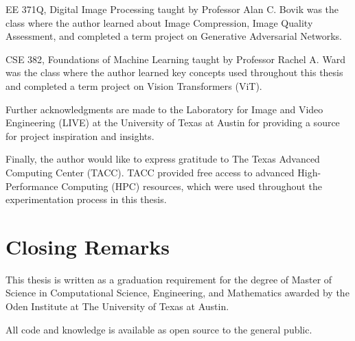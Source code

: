 EE 371Q, Digital Image Processing taught by Professor Alan C. Bovik was the class
where the author learned about 
Image Compression, Image Quality Assessment, and completed a term
project on Generative Adversarial Networks.


CSE 382, Foundations of Machine Learning taught by Professor Rachel A. Ward 
was the class where the author learned key concepts used throughout this thesis
and completed a term project on Vision Transformers (ViT).


Further acknowledgments are made to the Laboratory for Image and Video Engineering (LIVE) at the 
University of Texas at Austin for providing a source for project inspiration and insights.


Finally, the author would like to express gratitude to The Texas Advanced Computing Center (TACC).
TACC provided free access to advanced High-Performance Computing (HPC) resources,
which were used throughout the experimentation process in this thesis.

\section{Closing Remarks}

This thesis is written as a graduation requirement for the degree of Master of Science 
in Computational Science, Engineering, and Mathematics awarded by the Oden Institute at 
The University of Texas at Austin.


All code and knowledge is available as open source to the general public.